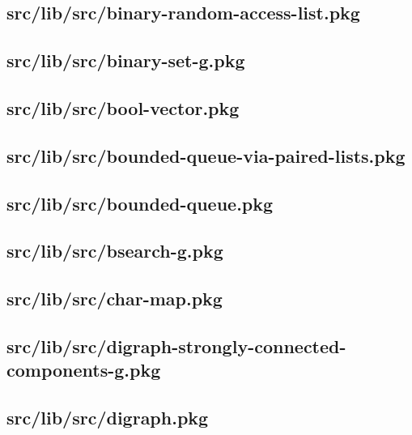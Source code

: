 \subsection{src/lib/src/binary-random-access-list.pkg}


\subsection{src/lib/src/binary-set-g.pkg}


\subsection{src/lib/src/bool-vector.pkg}


\subsection{src/lib/src/bounded-queue-via-paired-lists.pkg}


\subsection{src/lib/src/bounded-queue.pkg}


\subsection{src/lib/src/bsearch-g.pkg}


\subsection{src/lib/src/char-map.pkg}


\subsection{src/lib/src/digraph-strongly-connected-components-g.pkg}


\subsection{src/lib/src/digraph.pkg}


